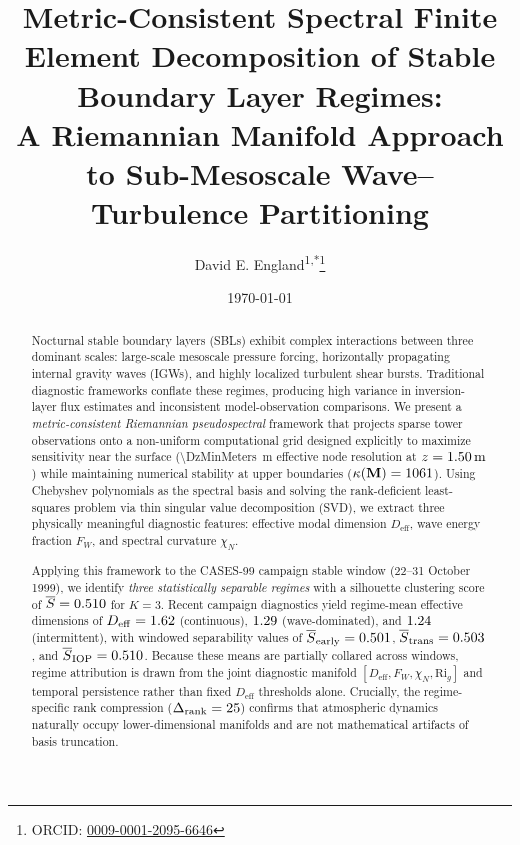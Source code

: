 \documentclass[11pt,a4paper]{article}
\title{Metric-Consistent Spectral Finite Element Decomposition of Stable Boundary Layer Regimes: \\
A Riemannian Manifold Approach to Sub-Mesoscale Wave--Turbulence Partitioning}
\author{David E. England\textsuperscript{1,*}\thanks{ORCID: \href{https://orcid.org/0009-0001-2095-6646}{0009-0001-2095-6646}}}
\affil{\textsuperscript{1}The University of Alabama in Huntsville, 301 Sparkman Drive, Huntsville, AL 35899, USA}
\affil{\textsuperscript{*}Corresponding author: David.England@UAH.Edu}
\date{\today}
\begin{document}
\maketitle


\begin{abstract}
Nocturnal stable boundary layers (SBLs) exhibit complex interactions between three dominant scales: large-scale mesoscale pressure forcing, horizontally propagating internal gravity waves (IGWs), and highly localized turbulent shear bursts. Traditional diagnostic frameworks conflate these regimes, producing high variance in inversion-layer flux estimates and inconsistent model-observation comparisons. We present a \emph{metric-consistent Riemannian pseudospectral} framework that projects sparse tower observations onto a non-uniform computational grid designed explicitly to maximize sensitivity near the surface (\SI{\DzMinMeters}{\meter} effective node resolution at $z = \SI{1.50}{\meter}$) while maintaining numerical stability at upper boundaries ($\kappa(\mathbf{M}) = 1061$). Using Chebyshev polynomials as the spectral basis and solving the rank-deficient least-squares problem via thin singular value decomposition (SVD), we extract three physically meaningful diagnostic features: effective modal dimension $D_{\mathrm{eff}}$, wave energy fraction $F_W$, and spectral curvature $\chi_N$.

Applying this framework to the CASES-99 campaign stable window (22--31 October 1999), we identify \emph{three statistically separable regimes} with a silhouette clustering score of $\overline{S} = 0.510$ for $K=3$. Recent campaign diagnostics yield regime-mean effective dimensions of $D_{\mathrm{eff}}=1.62$ (continuous), $1.29$ (wave-dominated), and $1.24$ (intermittent), with windowed separability values of $\overline{S}_{\mathrm{early}}=0.501$, $\overline{S}_{\mathrm{trans}}=0.503$, and $\overline{S}_{\mathrm{IOP}}=0.510$. Because these means are partially collared across windows, regime attribution is drawn from the joint diagnostic manifold $[D_{\mathrm{eff}}, F_W, \chi_N, \mathrm{Ri}_g]$ and temporal persistence rather than fixed $D_{\mathrm{eff}}$ thresholds alone. Crucially, the regime-specific rank compression ($\Delta_{\mathrm{rank}} = 25$) confirms that atmospheric dynamics naturally occupy lower-dimensional manifolds and are not mathematical artifacts of basis truncation.


\end{abstract}
\end{document}
